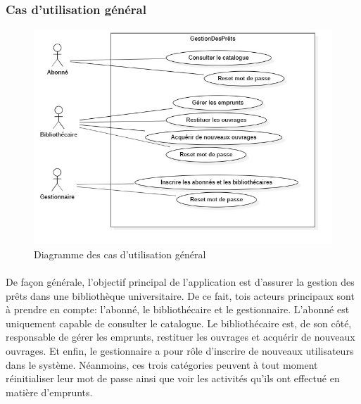 \subsubsection{Cas d'utilisation général} 
\begin{figure}[h]
        \centering
        \includegraphics[width=1\textwidth]{generalUseCase}
        \caption{Diagramme des cas d'utilisation général}
        \label{image-generalUseCase}
        \end{figure}
\paragraph{}
De façon générale, l'objectif principal de l'application est d'assurer la 
gestion des prêts dans une bibliothèque universitaire. De ce fait, tois 
acteurs principaux sont à prendre en compte: l'abonné, le bibliothécaire et 
le gestionnaire. L'abonné est uniquement capable de consulter le catalogue.
Le bibliothécaire est, de son côté, responsable de gérer les emprunts, restituer les ouvrages et 
acquérir de nouveaux ouvrages. Et enfin, le gestionnaire a pour rôle d'inscrire de nouveaux utilisateurs
dans le système. Néanmoins, ces trois catégories peuvent à tout moment réinitialiser leur mot de passe ainsi 
que voir les activités qu'ils ont effectué en matière d'emprunts.

